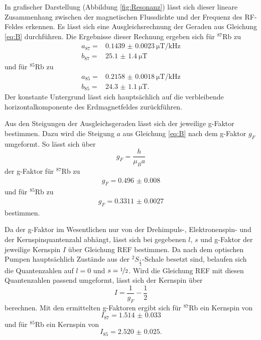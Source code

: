 In grafischer Darstellung (Abbildung \ref{fig:Resonanz}) lässt sich dieser lineare Zusammenhang zwischen der magnetischen Flussdichte und der Frequenz des RF-Feldes erkennen.
Es lässt sich eine Ausgleichsrechnung der Geraden aus Gleichung \eqref{eq:B} durchführen.
Die Ergebnisse dieser Rechnung ergeben sich für $^{87}$Rb zu  
\begin{align*}
    a_{87} = & \SI{0.1439(23)}{\micro\tesla\per\kilo\hertz} \\
    b_{87} = &\SI{25.1(14)}{\micro\tesla} 
\end{align*}
und für $^{85}$Rb zu
\begin{align*}
    a_{85} =& \SI{0.2158(18)}{\micro\tesla\per\kilo\hertz} \\
    b_{85} =&  \SI{24.3(11)}{\micro\tesla}.
\end{align*}
Der konstante Untergrund lässt sich hauptsächlich auf die verbleibende horizontalkomponente des Erdmagnetfeldes zurückführen. 



Aus den Steigungen der Ausgleichsgeraden lässt sich der jeweilige g-Faktor bestimmen.
Dazu wird die Steigung $a$ aus Gleichung \eqref{eq:B} nach dem g-Faktor $g_F$ umgeformt.
So lässt sich über
\begin{equation}
    g_F = \frac{h}{\mu_B a}
\end{equation}
der g-Faktor für $^{87}$Rb zu 
\begin{align*}
    g_F = \num{0.496(8)}
\end{align*}
und für $^{85}$Rb zu 
\begin{align*}
    g_F=\num{0.3311(27)}
\end{align*}
bestimmen.

Da der g-Faktor im Wesentlichen nur von der Drehimpuls-, Elektronenspin- und der Kernspinquantenzahl abhängt, lässt sich bei gegebenen $l$, $s$ und g-Faktor der jeweilige Kernspin $I$ über Gleichung REF bestimmen.
Da nach dem optischen Pumpen hauptsächlich Zustände aus der $^2S_{\frac{1}{2}}$-Schale besetzt sind, belaufen sich die Quantenzahlen auf $l=0$ und $s=\nicefrac{1}{2}$.
Wird die Gleichung REF mit diesen Quantenzahlen passend umgeformt, lässt sich der Kernspin über
\begin{equation}
    I = \frac{1}{g_F}-\frac{1}{2}
\end{equation}
berechnen.
Mit den ermittelten g-Faktoren ergibt sich für $^{87}$Rb ein Kernspin von
\begin{equation*}
    I_{87} = \num{1.514(33)}
\end{equation*}
und für $^{85}$Rb ein Kernspin von
\begin{equation*}
    I_{85} = \num{2.520(25)}. 
\end{equation*}



